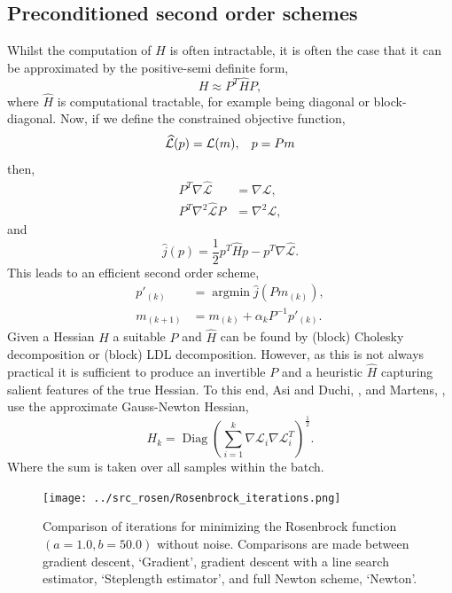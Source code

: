 \documentclass[11pt,twocolumn]{article}
\DeclareMathOperator*{\Diag}{Diag}
\DeclareMathOperator*{\argmin}{argmin}
\begin{document}
\subsection{Preconditioned second order schemes}
Whilst the computation of $H$ is often intractable, it is often the case that it can be approximated by the positive-semi definite form,
\begin{equation}
H \approx P^T \widehat{H} P,
\end{equation}
where $\widehat{H}$ is computational tractable, for example being diagonal or block-diagonal.  Now, if we define the constrained objective function,
\begin{equation}
\widehat{\mathcal{L}}(p)=\mathcal{L}(m), \hspace{0,3cm} p=Pm
\end{equation}
then,
\begin{align}
P^T \nabla \widehat{\mathcal{L}}&=\nabla \mathcal{L},\\
P^T \nabla^2 \widehat{\mathcal{L}} P&=\nabla^2 \mathcal{L},
\end{align}
and
\begin{equation}
\widehat{j}(p)=\frac{1}{2}p^T \widehat{H} p-p^T\nabla\widehat{\mathcal{L}}.
\end{equation} 
This leads to an efficient second order scheme, 
\begin{align}
p'_{(k)}&=\argmin{\widehat{j}(P m_{(k)})},\\
m_{(k+1)}&=m_{(k)}+\alpha_{k}P^{-1} p'_{(k)}.
\end{align}
Given a Hessian $H$ a suitable $P$ and $\widehat{H}$ can be found by (block) Cholesky decomposition or (block) LDL decomposition. However, as this is not always practical it is sufficient to produce an invertible $P$ and a heuristic $\widehat{H}$ capturing salient features of the true Hessian. To this end, Asi and Duchi, \cite{Asi:BetterStoch}, and Martens, \cite{Martens:Deep}, use the approximate Gauss-Newton Hessian,
\begin{equation}
H_k=\Diag{\left(\sum_{i=1}^k \nabla \mathcal{L}_i \nabla \mathcal{L}_i ^T\right)^{\frac{1}{2}}}.
\end{equation}
Where the sum is taken over all samples within the batch.
\begin{figure}[!ht]
\centering
\texttt{[image: ../src\_rosen/Rosenbrock\_iterations.png]}
\caption{Comparison of iterations for minimizing the Rosenbrock function $(a=1.0, b=50.0)$ without noise. Comparisons are made between gradient descent, `Gradient', gradient descent with a line search estimator, `Steplength estimator', and full Newton scheme, `Newton'.}\label{Rosenbrock_iter1}
\end{figure}
\end{document}
